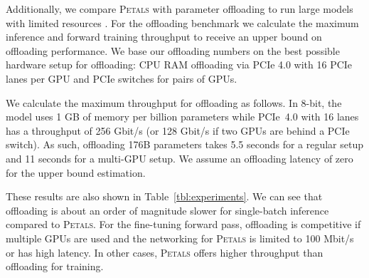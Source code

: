 Additionally, we compare \textsc{Petals} with parameter offloading to run large models with limited resources \citep{zerooffload,rajbhandari2021zero}. For the offloading benchmark we calculate the maximum inference and forward training throughput to receive an upper bound on offloading performance. We base our offloading numbers on the best possible hardware setup for offloading: CPU RAM offloading via PCIe 4.0 with 16 PCIe lanes per GPU and PCIe switches for pairs of GPUs.

We calculate the maximum throughput for offloading as follows. In 8-bit, the model uses 1 GB of memory per billion parameters while PCIe~4.0 with 16 lanes has a throughput of 256 Gbit/s (or 128 Gbit/s if two GPUs are behind a PCIe switch). As such, offloading 176B parameters takes 5.5 seconds for a regular setup and 11 seconds for a multi-GPU setup. We assume an offloading latency of zero for the upper bound estimation.

These results are also shown in Table~\ref{tbl:experiments}. We can see that offloading is about an order of magnitude slower for single-batch inference compared to \textsc{Petals}. For the fine-tuning forward pass, offloading is competitive if multiple GPUs are used and the networking for \textsc{Petals} is limited to 100 Mbit/s or has high latency. In other cases, \textsc{Petals} offers higher throughput than offloading for training.